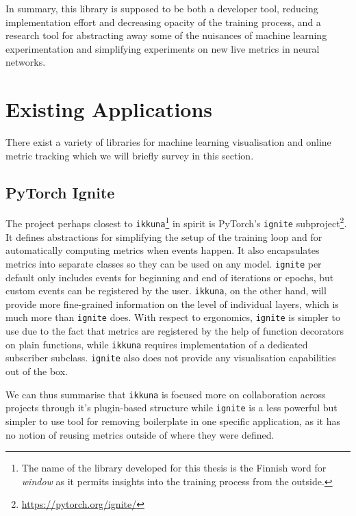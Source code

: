 In summary, this library is supposed to be both a developer tool, reducing
implementation effort and decreasing opacity of the training process, and a
research tool for abstracting away some of the nuisances of machine learning
experimentation and simplifying experiments on new live metrics in neural networks.

\hypertarget{sec:existing-apps}{%
\section{Existing Applications}\label{sec:existing-apps}}

There exist a variety of libraries for machine learning visualisation and online
metric tracking which we will briefly survey in this section.

\hypertarget{ignite}{%
\subsection*{PyTorch Ignite}\label{ignite}}

The project perhaps closest to \texttt{ikkuna}\footnote{The name of the library
developed for this thesis is the Finnish word for \emph{window} as it permits
insights into the training process from the outside.} in spirit is PyTorch's
\texttt{ignite} subproject\footnote{\url{https://pytorch.org/ignite/}}. It
defines abstractions for simplifying the setup of the training loop and for
automatically computing metrics when events happen. It also encapsulates metrics
into separate classes so they can be used on any model.  \texttt{ignite} per
default only includes events for beginning and end of iterations or epochs, but
custom events can be registered by the user.  \texttt{ikkuna}, on the other
hand, will provide more fine-grained information on the level of individual
layers, which is much more than \texttt{ignite} does. With respect to
ergonomics, \texttt{ignite} is simpler to use due to the fact that metrics are
registered by the help of function decorators on plain functions, while
\texttt{ikkuna} requires implementation of a dedicated subscriber subclass.
\texttt{ignite} also does not provide any visualisation capabilities out of the
box.

We can thus summarise that \texttt{ikkuna} is focused more on collaboration
across projects through it's plugin-based structure while \texttt{ignite} is a
less powerful but simpler to use tool for removing boilerplate in one specific
application, as it has no notion of reusing metrics outside of where they were
defined.

